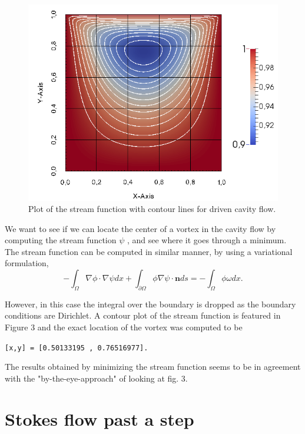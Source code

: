 \documentclass[11pt,a4paper,english]{article}
\numberwithin{equation}{section}
\begin{document}
\begin{figure}[h!]
\begin{center}
  \includegraphics[scale=0.4]{psi_square.png}
  \end{center}
  \caption{Plot of the stream function with contour lines for driven cavity flow.}
\end{figure}

We want to see if we can locate the center of a vortex in the cavity flow by computing the stream function $\psi$ , and see where it goes through a minimum. The stream function can be computed in similar manner, by using a variational formulation,  
\begin{equation}
-\int_\Omega \nabla \phi \cdot \nabla \psi dx + \int_{\partial \Omega} \phi \nabla \psi \cdot \mathbf{n} ds = - \int_\Omega \phi \omega dx.
\end{equation}

However, in this case the integral over the boundary is dropped as the boundary conditions are Dirichlet.
A contour plot of the stream function is featured in Figure 3 and the exact location of the vortex was computed to be 

\texttt{[x,y] =  [0.50133195 , 0.76516977].}

The results obtained by minimizing the stream function seems to be in agreement with the "by-the-eye-approach" of looking at fig. 3.  


\section{Stokes flow past a step}
\end{document}
